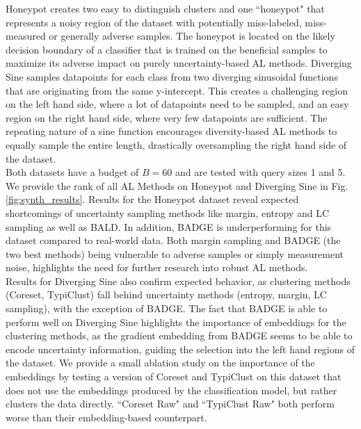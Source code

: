 \documentclass[]{article}
\begin{document}
%
Honeypot creates two easy to distinguish clusters and one ``honeypot" that represents a noisy region of the dataset with potentially miss-labeled, miss-measured or generally adverse samples.
The honeypot is located on the likely decision boundary of a classifier that is trained on the beneficial samples to maximize its adverse impact on purely uncertainty-based AL methods.
Diverging Sine samples datapoints for each class from two diverging sinusoidal functions that are originating from the same y-intercept.
This creates a challenging region on the left hand side, where a lot of datapoints need to be sampled, and an easy region on the right hand side, where very few datapoints are sufficient. 
The repeating nature of a sine function encourages diversity-based AL methods to equally sample the entire length, drastically oversampling the right hand side of the dataset. \\
Both datasets have a budget of $B=60$ and are tested with query sizes 1 and 5. \\[1mm]
We provide the rank of all AL Methods on Honeypot and Diverging Sine in Fig. \ref{fig:synth_results}.
Results for the Honeypot dataset reveal expected shortcomings of uncertainty sampling methods like margin, entropy and LC sampling as well as BALD.
In addition, BADGE is underperforming for this dataset compared to real-world data. 
Both margin sampling and BADGE (the two best methods) being vulnerable to adverse samples or simply measurement noise, highlights the need for further research into robust AL methods. \\
%
Results for Diverging Sine also confirm expected behavior, as clustering methods (Coreset, TypiClust) fall behind uncertainty methods (entropy, margin, LC sampling), with the exception of BADGE. 
The fact that BADGE is able to perform well on Diverging Sine highlights the importance of embeddings for the clustering methods, as the gradient embedding from BADGE seems to be able to encode uncertainty information, guiding the selection into the left hand regions of the dataset. 
We provide a small ablation study on the importance of the embeddings by testing a version of Coreset and TypiClust on this dataset that does not use the embeddings produced by the classification model, but rather clusters the data directly.
``Coreset Raw" and ``TypiClust Raw" both perform worse than their embedding-based counterpart.
\end{document}
